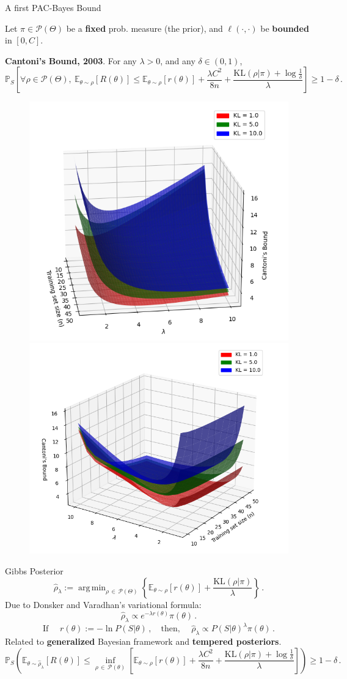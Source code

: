 \documentclass[aspectratio=159]{beamer}
\DeclareMathOperator*{\argmin}{arg\,min}
\begin{document}
    {
    \begin{frame}{A first PAC-Bayes Bound}

    Let \(\pi \in \mathcal{P}(\Theta)\) be a \textbf{fixed} prob. measure (the prior), and \(\ell(\cdot, \cdot)\) be \textbf{bounded} in \([0, C]\).
    \pause

    \textbf{Cantoni's Bound, 2003}. For any \(\lambda > 0\), and any \(\delta \in (0,1)\),
    \[
    \mathbb{P}_S \left[ \forall \rho \in \mathcal{P}(\Theta), \ \mathbb{E}_{\theta \sim \rho}[R(\theta)] \leq \mathbb{E}_{\theta \sim \rho}[r(\theta)] + \frac{\lambda C^2}{8n} + \frac{\text{KL}(\rho|\pi) + \log\tfrac{1}{\delta}}{\lambda}\right] \geq 1-\delta\,.
    \]
    \begin{figure}
        \centering
        \includegraphics[width=0.35\linewidth]{imgs/cantoni.png}
        \includegraphics[width=0.37\linewidth]{imgs/cantoni2.png}
    \end{figure}
    \end{frame}
    }

    \begin{frame}{Gibbs Posterior}
        \[
            \hat{\rho}_\lambda := \argmin_{\rho \, \in \, \mathcal{P}(\Theta)} \left\{ \mathbb{E}_{\theta \sim \rho}[r(\theta)] + \frac{\text{KL}(\rho|\pi)}{\lambda} \right\}\,.
        \]
        Due to Donsker and Varadhan’s variational formula:
        \[
        \hat{\rho}_\lambda \propto e^{-\lambda r(\theta)}\pi(\theta)\,.
        \]
        \pause
        \[
            \text{If } \quad r(\theta) := -\ln P(S|\theta)\,, \quad \text{then, } \quad \hat{\rho}_\lambda \propto P(S|\theta)^\lambda\pi(\theta)\,.
        \]
        Related to \textbf{generalized} Bayesian framework and \textbf{tempered posteriors}.
        \pause
        \[
        \mathbb{P}_S \left( \mathbb{E}_{\theta \sim \hat{\rho}_\lambda}[R(\theta)] \leq \inf_{\rho \, \in \, \mathcal{P}(\theta)} \left[\mathbb{E}_{\theta \sim \rho}[r(\theta)] + \frac{\lambda C^2}{8n} + \frac{\text{KL}(\rho|\pi) + \log\tfrac{1}{\delta}}{\lambda}\right]\right) \geq 1-\delta\,.
        \]
    \end{frame}
\end{document}

